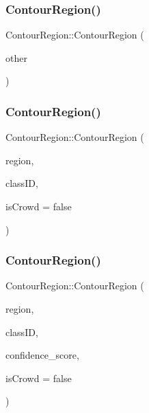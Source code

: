 \subsubsection{\texorpdfstring{Contour\+Region()}{ContourRegion()}\hspace{0.1cm}{\footnotesize\ttfamily [2/4]}}
{\footnotesize\ttfamily Contour\+Region\+::\+Contour\+Region (\begin{DoxyParamCaption}\item[{const \hyperlink{struct_contour_region}{Contour\+Region} \&}]{other }\end{DoxyParamCaption})}

\mbox{\label{struct_contour_region_a90dad855c151582191accdcffa31e0cf}} 
\subsubsection{\texorpdfstring{Contour\+Region()}{ContourRegion()}\hspace{0.1cm}{\footnotesize\ttfamily [3/4]}}
{\footnotesize\ttfamily Contour\+Region\+::\+Contour\+Region (\begin{DoxyParamCaption}\item[{const std\+::vector$<$ cv\+::\+Point $>$ \&}]{region,  }\item[{std\+::string}]{class\+ID,  }\item[{bool}]{is\+Crowd = {\ttfamily false} }\end{DoxyParamCaption})\hspace{0.3cm}{\ttfamily [inline]}}

\mbox{\label{struct_contour_region_aa3acba5c43fdabd50f9b8bef282c12fc}} 
\subsubsection{\texorpdfstring{Contour\+Region()}{ContourRegion()}\hspace{0.1cm}{\footnotesize\ttfamily [4/4]}}
{\footnotesize\ttfamily Contour\+Region\+::\+Contour\+Region (\begin{DoxyParamCaption}\item[{const std\+::vector$<$ cv\+::\+Point $>$ \&}]{region,  }\item[{std\+::string}]{class\+ID,  }\item[{double}]{confidence\+\_\+score,  }\item[{bool}]{is\+Crowd = {\ttfamily false} }\end{DoxyParamCaption})\hspace{0.3cm}{\ttfamily [inline]}}



